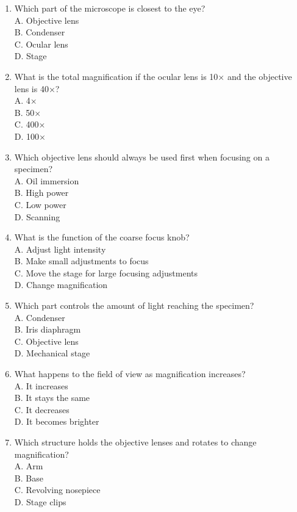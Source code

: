 \documentclass[
  letterpaper,
  DIV=11,
  numbers=noendperiod]{scrreprt}
\begin{document}
\begin{enumerate}
\def\labelenumi{\arabic{enumi}.}
\item
  Which part of the microscope is closest to the eye?\\
  A. Objective lens\\
  B. Condenser\\
  C. Ocular lens\\
  D. Stage
\item
  What is the total magnification if the ocular lens is 10× and the
  objective lens is 40×?\\
  A. 4×\\
  B. 50×\\
  C. 400×\\
  D. 100×
\item
  Which objective lens should always be used first when focusing on a
  specimen?\\
  A. Oil immersion\\
  B. High power\\
  C. Low power\\
  D. Scanning
\item
  What is the function of the coarse focus knob?\\
  A. Adjust light intensity\\
  B. Make small adjustments to focus\\
  C. Move the stage for large focusing adjustments\\
  D. Change magnification
\item
  Which part controls the amount of light reaching the specimen?\\
  A. Condenser\\
  B. Iris diaphragm\\
  C. Objective lens\\
  D. Mechanical stage
\item
  What happens to the field of view as magnification increases?\\
  A. It increases\\
  B. It stays the same\\
  C. It decreases\\
  D. It becomes brighter
\item
  Which structure holds the objective lenses and rotates to change
  magnification?\\
  A. Arm\\
  B. Base\\
  C. Revolving nosepiece\\
  D. Stage clips

\end{enumerate}
\end{document}
